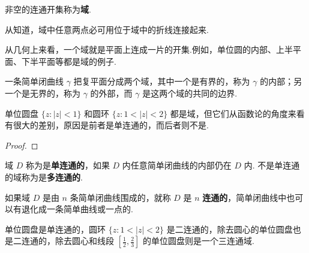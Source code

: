 \documentclass[../../main.tex]{subfiles}
\begin{document}
\begin{definition}
非空的连通开集称为\textbf{域}.
\end{definition}
\begin{note}
从知道，域中任意两点必可用位于域中的折线连接起来.

从几何上来看，一个域就是平面上连成一片的开集.例如，单位圆的内部、上半平面、下半平面等都是域的例子.
\end{note}

\begin{theorem}[Jordan定理]\label{theorem:Jordan定理}
一条简单闭曲线 $\gamma$ 把复平面分成两个域，其中一个是有界的，称为 $\gamma$ 的内部；另一个是无界的，称为 $\gamma$ 的外部，而 $\gamma$ 是这两个域的共同的边界.
\end{theorem}
\begin{note}
单位圆盘 $\{ z: \vert z \vert < 1\}$ 和圆环 $\{ z: 1 < \vert z \vert < 2\}$ 都是域，但它们从函数论的角度来看有很大的差别，原因是前者是单连通的，而后者则不是.
\end{note}
\begin{proof}

\end{proof}


\begin{definition}
域 $D$ 称为是\textbf{单连通的}，如果 $D$ 内任意简单闭曲线的内部仍在 $D$ 内. 不是单连通的域称为是\textbf{多连通的}.
\end{definition}

\begin{definition}
如果域 $D$ 是由 $n$ 条简单闭曲线围成的，就称 $D$ 是 $n$ \textbf{连通的}，简单闭曲线中也可以有退化成一条简单曲线或一点的.
\end{definition}

\begin{example}
单位圆盘是单连通的，圆环 $\{ z: 1 < \vert z \vert < 2\}$ 是二连通的，除去圆心的单位圆盘也是二连通的，除去圆心和线段 $\left[ \frac{1}{2}, \frac{2}{3} \right]$ 的单位圆盘则是一个三连通域.
\end{example}
\end{document}
